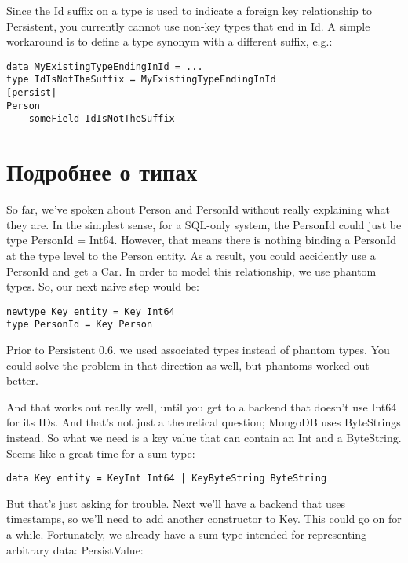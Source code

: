 \begin{remark}
Since the Id suffix on a type is used to indicate a foreign key relationship to Persistent, you currently cannot use non-key types that end in Id. A simple workaround is to define a type synonym with a different suffix, e.g.:

\begin{lstlisting}
data MyExistingTypeEndingInId = ...
type IdIsNotTheSuffix = MyExistingTypeEndingInId
[persist|
Person
    someField IdIsNotTheSuffix
\end{lstlisting}%
\end{remark}

\section{Подробнее о типах} %

So far, we've spoken about Person and PersonId without really explaining what they are. In the simplest sense, for a SQL-only system, the PersonId could just be type PersonId = Int64. However, that means there is nothing binding a PersonId at the type level to the Person entity. As a result, you could accidently use a PersonId and get a Car. In order to model this relationship, we use phantom types. So, our next naive step would be:

\begin{lstlisting}
newtype Key entity = Key Int64
type PersonId = Key Person
\end{lstlisting}

\begin{remark}
Prior to Persistent 0.6, we used associated types instead of phantom types. You could solve the problem in that direction as well, but phantoms worked out better.
\end{remark}

And that works out really well, until you get to a backend that doesn't use Int64 for its IDs. And that's not just a theoretical question; MongoDB uses ByteStrings instead. So what we need is a key value that can contain an Int and a ByteString. Seems like a great time for a sum type:

\begin{lstlisting}
data Key entity = KeyInt Int64 | KeyByteString ByteString
\end{lstlisting}

But that's just asking for trouble. Next we'll have a backend that uses timestamps, so we'll need to add another constructor to Key. This could go on for a while. Fortunately, we already have a sum type intended for representing arbitrary data: PersistValue:


